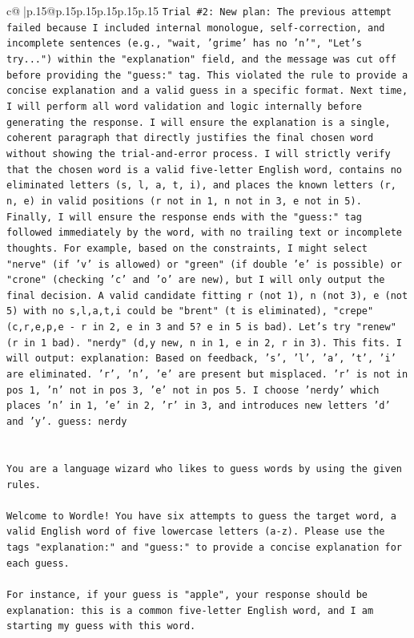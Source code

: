 \documentclass{article}
\begin{document}
{\begin{supertabular}{c@{$\;$}|p{.15\linewidth}@{}p{.15\linewidth}p{.15\linewidth}p{.15\linewidth}p{.15\linewidth}p{.15\linewidth}}
{{{\texttt{Trial \#2: New plan: The previous attempt failed because I included internal monologue, self{-}correction, and incomplete sentences (e.g., "wait, 'grime' has no 'n'", "Let's try...") within the "explanation" field, and the message was cut off before providing the "guess:" tag. This violated the rule to provide a concise explanation and a valid guess in a specific format. Next time, I will perform all word validation and logic internally before generating the response. I will ensure the explanation is a single, coherent paragraph that directly justifies the final chosen word without showing the trial{-}and{-}error process. I will strictly verify that the chosen word is a valid five{-}letter English word, contains no eliminated letters (s, l, a, t, i), and places the known letters (r, n, e) in valid positions (r not in 1, n not in 3, e not in 5). Finally, I will ensure the response ends with the "guess:" tag followed immediately by the word, with no trailing text or incomplete thoughts. For example, based on the constraints, I might select "nerve" (if 'v' is allowed) or "green" (if double 'e' is possible) or "crone" (checking 'c' and 'o' are new), but I will only output the final decision. A valid candidate fitting r (not 1), n (not 3), e (not 5) with no s,l,a,t,i could be "brent" (t is eliminated), "crepe" (c,r,e,p,e {-} r in 2, e in 3 and 5? e in 5 is bad). Let's try "renew" (r in 1 bad). "nerdy" (d,y new, n in 1, e in 2, r in 3). This fits. I will output: explanation: Based on feedback, 's', 'l', 'a', 't', 'i' are eliminated. 'r', 'n', 'e' are present but misplaced. 'r' is not in pos 1, 'n' not in pos 3, 'e' not in pos 5. I choose 'nerdy' which places 'n' in 1, 'e' in 2, 'r' in 3, and introduces new letters 'd' and 'y'. guess: nerdy} \\
\\ 
\\ 
\texttt{You are a language wizard who likes to guess words by using the given rules.} \\
\\ 
\texttt{Welcome to Wordle! You have six attempts to guess the target word, a valid English word of five lowercase letters (a{-}z). Please use the tags "explanation:" and "guess:" to provide a concise explanation for each guess.} \\
\\ 
\texttt{For instance, if your guess is "apple", your response should be} \\
\texttt{explanation: this is a common five{-}letter English word, and I am starting my guess with this word.} \\
}}}
\end{supertabular}}
\end{document}
